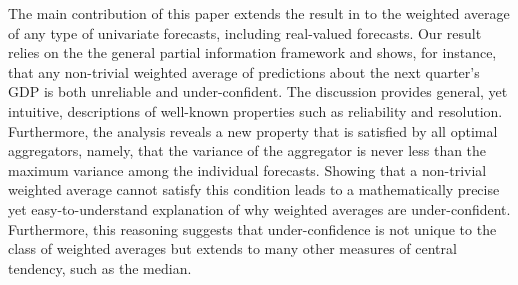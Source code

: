 \documentclass[11pt]{article}
\theoremstyle{definition}
\theoremstyle{definition}
\begin{document}
The main contribution of this paper extends the result
in \cite{Ranjan08} to the weighted average of any type of univariate
forecasts, including real-valued forecasts.
Our result relies on the the general partial information framework and shows, for instance, that any non-trivial
weighted average of predictions about the next quarter's GDP
is both unreliable and under-confident. The discussion
provides general, yet intuitive, descriptions of well-known properties
such as reliability and resolution. Furthermore, the analysis reveals a new property
that is satisfied by all optimal aggregators, namely, that the variance of
the aggregator is
never less than the maximum variance among the individual
forecasts. Showing that a non-trivial weighted average cannot satisfy
this condition leads to a mathematically precise yet
easy-to-understand explanation of why weighted averages are
under-confident.  Furthermore, this reasoning suggests that
under-confidence is not unique to the class of weighted averages but
extends to many other measures of central tendency, such as the
median.
\end{document}
